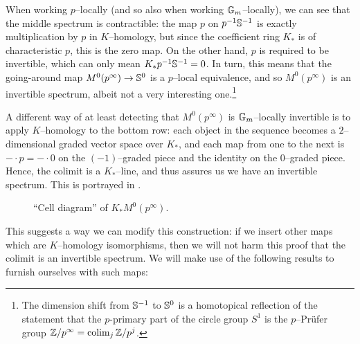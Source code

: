 When working $p$--locally (and so also when working $\G_m$--locally), we can see that the middle spectrum is contractible: the map $p$ on $p^{-1} \S^{-1}$ is exactly multiplication by $p$ in $K$--homology, but since the coefficient ring $K_*$ is of characteristic $p$, this is the zero map.  On the other hand, $p$ is required to be invertible, which can only mean $K_* p^{-1} \S^{-1} = 0$.  In turn, this means that the going-around map $M^0(p^\infty) \to \S^0$ is a $p$--local equivalence, and so $M^0(p^\infty)$ is an invertible spectrum, albeit not a very interesting one.\footnote{The dimension shift from $\S^{-1}$ to $\S^0$ is a homotopical reflection of the statement that the $p$-primary part of the circle group $S^1$ is the $p$--Pr\"ufer group $\Z/p^\infty = \colim_j \Z/p^j$.}

A different way of at least detecting that $M^0(p^\infty)$ is $\G_m$--locally invertible is to apply $K$--homology to the bottom row: each object in the sequence becomes a $2$--dimensional graded vector space over $K_*$, and each map from one to the next is $- \cdot p = - \cdot 0$ on the $(-1)$--graded piece and the identity on the $0$--graded piece.  Hence, the colimit is a $K_*$--line, and  thus assures us we have an invertible spectrum.  This is portrayed in .
\begin{figure}[h]
\begin{center}
\end{center}
\caption{``Cell diagram'' of $K_* M^0(p^\infty)$.}\label{CellDiagramFigure}
\end{figure}
This suggests a way we can modify this construction: if we insert other maps which are $K$--homology isomorphisms, then we will not harm this proof that the colimit is an invertible spectrum.  We will make use of the following results to furnish ourselves with such maps:

